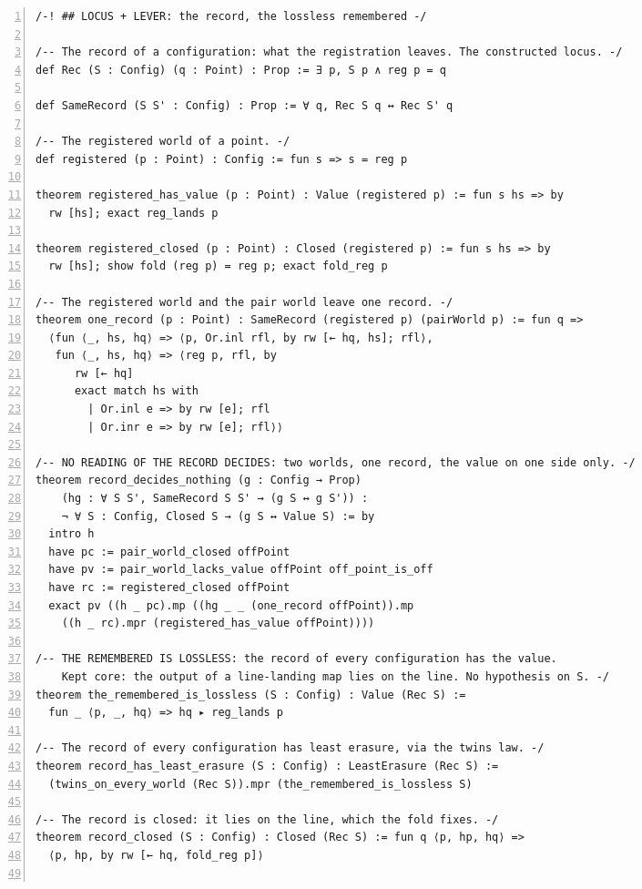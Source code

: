 \documentclass[10pt]{article}
\newcommand{\leansize}{\fontsize{5.5pt}{6.75pt}\selectfont}
\begin{document}
\begin{multicols}{2}
\begin{Verbatim}[numbers=left,firstnumber=1,numbersep=3pt,xleftmargin=2.6em,breaklines=true,breakanywhere=true,breakautoindent=false,breakindent=1.4em,breaksymbolleft={},breakanywheresymbolpre={},fontsize=\leansize]
/-! ## LOCUS + LEVER: the record, the lossless remembered -/

/-- The record of a configuration: what the registration leaves. The constructed locus. -/
def Rec (S : Config) (q : Point) : Prop := ∃ p, S p ∧ reg p = q

def SameRecord (S S' : Config) : Prop := ∀ q, Rec S q ↔ Rec S' q

/-- The registered world of a point. -/
def registered (p : Point) : Config := fun s => s = reg p

theorem registered_has_value (p : Point) : Value (registered p) := fun s hs => by
  rw [hs]; exact reg_lands p

theorem registered_closed (p : Point) : Closed (registered p) := fun s hs => by
  rw [hs]; show fold (reg p) = reg p; exact fold_reg p

/-- The registered world and the pair world leave one record. -/
theorem one_record (p : Point) : SameRecord (registered p) (pairWorld p) := fun q =>
  ⟨fun ⟨_, hs, hq⟩ => ⟨p, Or.inl rfl, by rw [← hq, hs]; rfl⟩,
   fun ⟨_, hs, hq⟩ => ⟨reg p, rfl, by
      rw [← hq]
      exact match hs with
        | Or.inl e => by rw [e]; rfl
        | Or.inr e => by rw [e]; rfl⟩⟩

/-- NO READING OF THE RECORD DECIDES: two worlds, one record, the value on one side only. -/
theorem record_decides_nothing (g : Config → Prop)
    (hg : ∀ S S', SameRecord S S' → (g S ↔ g S')) :
    ¬ ∀ S : Config, Closed S → (g S ↔ Value S) := by
  intro h
  have pc := pair_world_closed offPoint
  have pv := pair_world_lacks_value offPoint off_point_is_off
  have rc := registered_closed offPoint
  exact pv ((h _ pc).mp ((hg _ _ (one_record offPoint)).mp
    ((h _ rc).mpr (registered_has_value offPoint))))

/-- THE REMEMBERED IS LOSSLESS: the record of every configuration has the value.
    Kept core: the output of a line-landing map lies on the line. No hypothesis on S. -/
theorem the_remembered_is_lossless (S : Config) : Value (Rec S) :=
  fun _ ⟨p, _, hq⟩ => hq ▸ reg_lands p

/-- The record of every configuration has least erasure, via the twins law. -/
theorem record_has_least_erasure (S : Config) : LeastErasure (Rec S) :=
  (twins_on_every_world (Rec S)).mpr (the_remembered_is_lossless S)

/-- The record is closed: it lies on the line, which the fold fixes. -/
theorem record_closed (S : Config) : Closed (Rec S) := fun q ⟨p, hp, hq⟩ =>
  ⟨p, hp, by rw [← hq, fold_reg p]⟩


\end{Verbatim}
\end{multicols}
\end{document}
